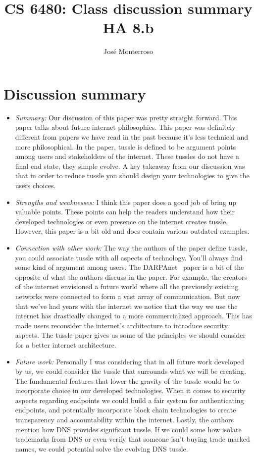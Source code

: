 \documentclass[letterpaper,twocolumn,10pt]{article}
\title{CS 6480: Class discussion summary\\
HA 8.b\\}
\author{José Monterroso}
\affil{School of Computing, University of Utah}
\begin{document}
\maketitle
\section*{Discussion summary}

\begin{itemize}

\item {\it Summary:}
Our discussion of this paper was pretty straight forward. This paper talks about future internet philosophies.
This paper was definitely different from papers we have read in the past because it's less technical and more
philosophical. In the paper, tussle is defined to be argument points among users and stakeholders of the internet.
These tussles do not have a final end state, they simple evolve. A key takeaway from our discussion was that in order
to reduce tussle you should design your technologies to give the users choices.

\item {\it Strengths and weaknesses:} 
I think this paper does a good job of bring up valuable points. These points can help the readers understand
how their developed technologies or even presence on the internet creates tussle. However, this paper is a bit
old and does contain various outdated examples. 

\item {\it Connection with other work:} 
The way the authors of the paper define tussle, you could associate tussle with all aspects of technology.
You'll always find some kind of argument among users. The DARPAnet~\cite{darpa} paper is a bit of the 
opposite of what the authors discuss in the paper. For example, the creators of the internet envisioned a future
world where all the previously existing networks were connected to form a vast array of communication. But
now that we've had years with the internet we notice that the way we use the internet has drastically 
changed to a more commercialized approach. This has made users reconsider the internet's architecture
to introduce security aspects. The tussle paper gives us some of the principles we should consider for a better
internet architecture.  

\item {\it Future work:} 
Personally I was considering that in all future work developed by us, we could consider the tussle that 
surrounds what we will be creating. The fundamental features that lower the gravity of the tussle would be 
to incorporate choice in our developed technologies. When it comes to security aspects regarding endpoints
we could build a fair system for authenticating endpoints, and potentially incorporate block chain technologies
to create transparency and accountability within the internet. Lastly, the authors mention how DNS provides 
significant tussle. If we could some how isolate trademarks from DNS or even verify that someone isn't buying
trade marked names, we could potential solve the evolving DNS tussle. 

\end{itemize}
{
  \small 
  
  
}
\end{document}
